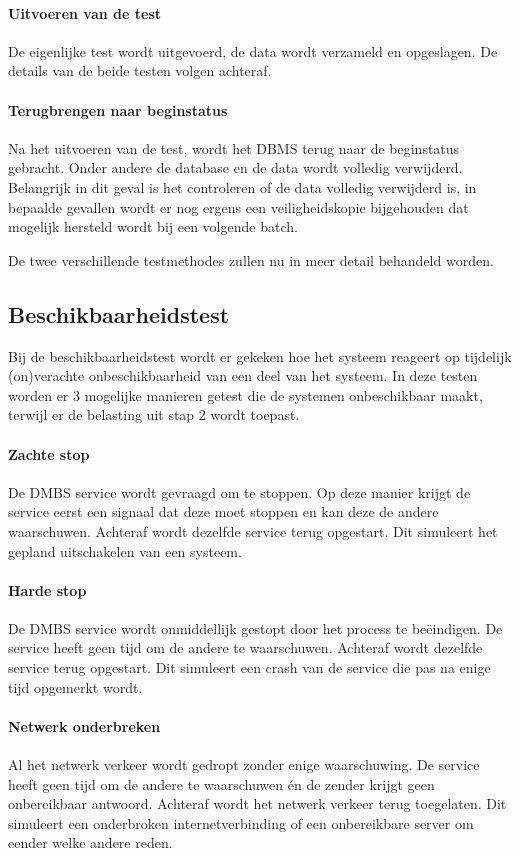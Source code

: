 \paragraph{Uitvoeren van de test} De eigenlijke test wordt uitgevoerd, de data wordt verzameld en opgeslagen. De details van de beide testen volgen achteraf. 

\paragraph{Terugbrengen naar beginstatus} Na het uitvoeren van de test, wordt het DBMS terug naar de beginstatus gebracht. Onder andere de database en de data wordt volledig verwijderd. Belangrijk in dit geval is het controleren of de data volledig verwijderd is, in bepaalde gevallen wordt er nog ergens een veiligheidskopie bijgehouden dat mogelijk hersteld wordt bij een volgende batch. 

De twee verschillende testmethodes zullen nu in meer detail behandeld worden. 
\subsection{Beschikbaarheidstest}
Bij de beschikbaarheidstest wordt er gekeken hoe het systeem reageert op tijdelijk (on)verachte onbeschikbaarheid van een deel van het systeem. In deze testen worden er 3 mogelijke manieren getest die de systemen onbeschikbaar maakt, terwijl er de belasting uit stap 2 wordt toepast. 

\paragraph{Zachte stop} De DMBS service wordt gevraagd om te stoppen. Op deze manier krijgt de service eerst een signaal dat deze moet stoppen en kan deze de andere waarschuwen. Achteraf wordt dezelfde service terug opgestart. Dit simuleert het gepland uitschakelen van een systeem. 

\paragraph{Harde stop} De DMBS service wordt onmiddellijk gestopt door het process te beëindigen. De service heeft geen tijd om de andere te waarschuwen. Achteraf wordt dezelfde service terug opgestart. Dit simuleert een crash van de service die pas na enige tijd opgemerkt wordt. 

\paragraph{Netwerk onderbreken} Al het netwerk verkeer wordt gedropt zonder enige waarschuwing. De service heeft geen tijd om de andere te waarschuwen én de zender krijgt geen onbereikbaar antwoord. Achteraf wordt het netwerk verkeer terug toegelaten. Dit simuleert een onderbroken internetverbinding of een onbereikbare server om eender welke andere reden.  

